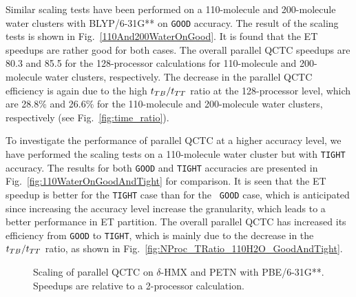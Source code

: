 \commentoutA{\documentclass[prl,aps,twocolumn,twocolumngrid,superbib]{revtex4}}
\begin{document}
Similar scaling tests have been performed on a 110-molecule and
200-molecule water clusters with BLYP/6-31G** on {\tt GOOD} accuracy.
The result of the scaling tests is shown in
Fig.~\ref{110And200WaterOnGood}. It is found that the ET speedups are
rather good for both cases. The overall parallel QCTC speedups are
80.3 and 85.5 for the 128-processor calculations for 110-molecule and
200-molecule water clusters, respectively.
The decrease in the parallel QCTC efficiency is again due to the
high $t_{TB}/t_{TT}$ ratio at the 128-processor level, which are 28.8\%
and 26.6\% for the 110-molecule and 200-molecule water clusters,
respectively (see Fig.~\ref{fig:time_ratio}).

To investigate the performance of parallel QCTC at a higher accuracy
level, we have performed the scaling tests on a 110-molecule water
cluster but with {\tt TIGHT} accuracy. The results for both {\tt GOOD}
and {\tt TIGHT} accuracies are presented in
Fig.~\ref{fig:110WaterOnGoodAndTight} for comparison.  It is seen that
the ET speedup is better for the {\tt TIGHT} case than for the {\tt
GOOD} case, which is anticipated since increasing the accuracy level
increase the granularity, which leads to a better performance in ET
partition\cite{CGan03}.  The overall parallel QCTC has increased its
efficiency from {\tt GOOD} to {\tt TIGHT}, which is mainly due to the
decrease in the $t_{TB}/t_{TT}$ ratio, as shown in
Fig.~\ref{fig:NProc_TRatio_110H2O_GoodAndTight}.


\begin{figure}[t]
\caption{ 
Scaling of parallel QCTC on $\delta$-HMX and PETN with PBE/6-31G**.
Speedups are relative to a 2-processor calculation.  }
\label{fig:111DHMX212PETN}
\end{figure}
\end{document}
